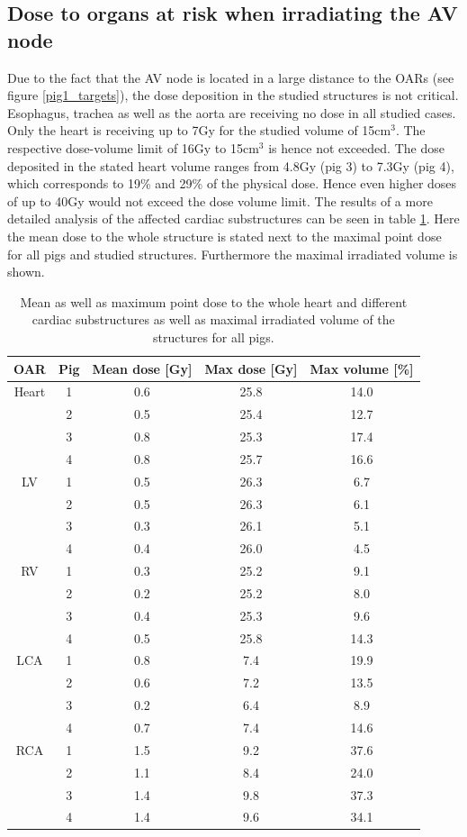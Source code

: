 \documentclass[type=dr, dr=rernat, accentcolor=tud7b,colorbacktitle, bigchapter, openright, twoside, 12pt ]{tudthesis}
\begin{document}
\newpage


\subsection{Dose to organs at risk when irradiating the AV node}

Due to the fact that the AV node is located in a large distance to the OARs (see figure \ref{pig1_targets}), the dose deposition in the 
studied structures is not critical. Esophagus, trachea as well as the aorta are receiving no dose in all studied cases. 
Only the heart is receiving up to 7Gy for the studied volume of 15cm$^{3}$. The respective dose-volume limit of 16Gy to 15cm$^{3}$ is hence 
not exceeded.  The dose deposited in the stated heart volume ranges from 4.8Gy (pig 3) to 7.3Gy (pig 4), which corresponds to 19\% and 29\% of 
the physical dose. Hence even higher doses of up to 40Gy would not exceed the dose volume limit. 
The results of a more detailed analysis of the affected cardiac substructures can be seen in table \ref{DV_OAR:pig}. Here the mean dose to the 
whole structure is stated next to the maximal point dose for all pigs and studied structures. Furthermore the maximal irradiated volume 
is shown. 


\begin{table}[htbp]
\footnotesize
\centering
\caption{Mean as well as maximum point dose to the whole heart and different cardiac substructures as well as maximal irradiated 
volume of the structures for all pigs.}
  \begin{tabular}{ |c||c||c|c|c|}
    \hline
    OAR & Pig & Mean dose [Gy] & Max dose [Gy] & Max volume [\%] \\ \hline \hline
Heart & 1 & 0.6 & 25.8 & 14.0 \\ 
 & 2 & 0.5 & 25.4 & 12.7 \\ 
 & 3 & 0.8 & 25.3 & 17.4 \\ 
 & 4 & 0.8 & 25.7 & 16.6 \\ 
\hline
LV & 1 & 0.5 & 26.3 & 6.7 \\ 
 & 2 & 0.5 & 26.3 & 6.1 \\ 
 & 3 & 0.3 & 26.1 & 5.1 \\ 
 & 4 & 0.4 & 26.0 & 4.5 \\ 
\hline
RV & 1 & 0.3 & 25.2 & 9.1 \\ 
 & 2 & 0.2 & 25.2 & 8.0 \\ 
 & 3 & 0.4 & 25.3 & 9.6 \\ 
 & 4 & 0.5 & 25.8 & 14.3 \\ 
\hline
LCA & 1 & 0.8 & 7.4 & 19.9 \\ 
 & 2 & 0.6 & 7.2 & 13.5 \\ 
 & 3 & 0.2 & 6.4 & 8.9 \\ 
 & 4 & 0.7 & 7.4 & 14.6 \\ 
\hline
RCA & 1 & 1.5 & 9.2 & 37.6 \\ 
 & 2 & 1.1 & 8.4 & 24.0 \\ 
 & 3 & 1.4 & 9.8 & 37.3 \\ 
 & 4 & 1.4 & 9.6 & 34.1 \\ 
\hline
  \end{tabular}
  \label{DV_OAR:pig}
\end{table}
\end{document}
